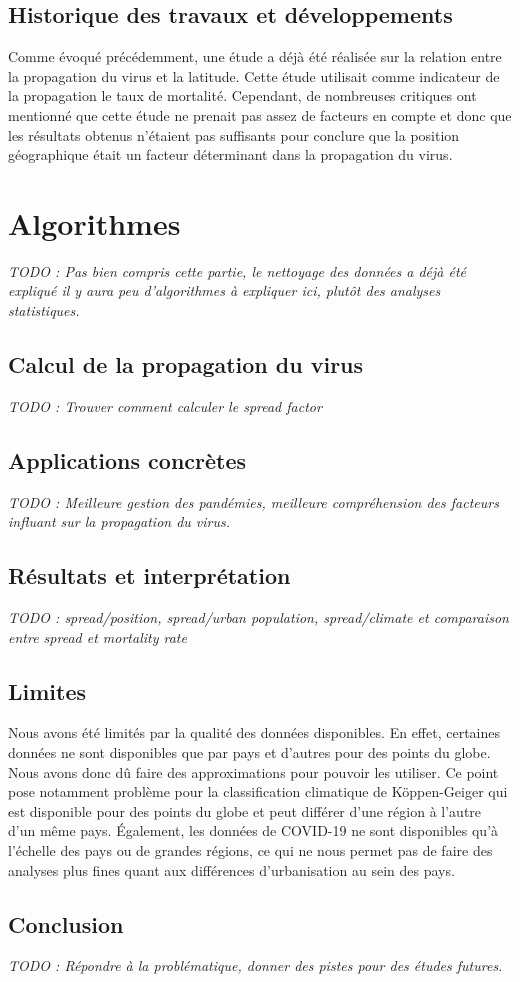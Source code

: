 \documentclass[12pt]{iEEEtran}
\begin{document}
\subsection{Historique des travaux et développements}
Comme évoqué précédemment, une étude \cite{kaggle} a déjà été réalisée sur la relation entre
la propagation du virus et la latitude. Cette étude utilisait comme indicateur de la propagation
le taux de mortalité. Cependant, de nombreuses critiques ont mentionné que cette étude ne prenait
pas assez de facteurs en compte et donc que les résultats obtenus n'étaient pas suffisants pour
conclure que la position géographique était un facteur déterminant dans la propagation du virus.

\section{Algorithmes}
\textit{TODO : Pas bien compris cette partie, le nettoyage des données a déjà été expliqué
il y aura peu d'algorithmes à expliquer ici, plutôt des analyses statistiques.}

\subsection{Calcul de la propagation du virus}
\textit{TODO : Trouver comment calculer le spread factor}
\subsection{Applications concrètes}
\textit{TODO : Meilleure gestion des pandémies, meilleure compréhension des facteurs
influant sur la propagation du virus.}

\subsection{Résultats et interprétation}
\textit{TODO : spread/position, spread/urban population, spread/climate et comparaison entre
spread et mortality rate}
\subsection{Limites}
Nous avons été limités par la qualité des données disponibles. En effet, certaines données
ne sont disponibles que par pays et d'autres pour des points du globe. Nous avons donc dû
faire des approximations pour pouvoir les utiliser. Ce point pose notamment problème pour
la classification climatique de Köppen-Geiger qui est disponible pour des points du globe et
peut différer d'une région à l'autre d'un même pays. Également, les données de COVID-19
ne sont disponibles qu'à l'échelle des pays ou de grandes régions, ce qui ne nous permet
pas de faire des analyses plus fines quant aux différences d'urbanisation au sein des pays.

\subsection{Conclusion}
\textit{TODO : Répondre à la problématique, donner des pistes pour des études futures.}



\end{document}
